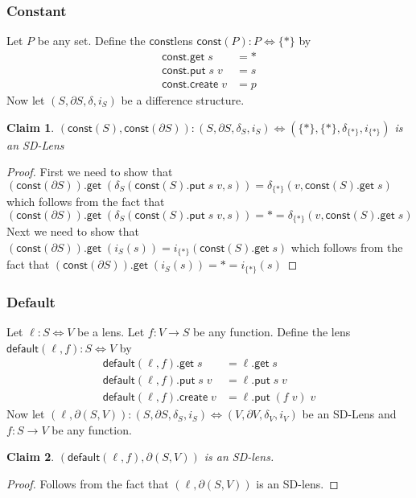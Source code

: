 \documentclass[acmsmall,review,anonymous]{acmart}\settopmatter{printfolios=true,printccs=false,printacmref=false}
\newtheorem{claim}{Claim}
\newcommand{\kw}[1]{\ensuremath{\mathsf{#1}}}
\newcommand{\get}{\ensuremath{\kw{get}}}
\newcommand{\pput}{\ensuremath{\kw{put}}}
\newcommand{\create}{\ensuremath{\kw{create}}}
\newcommand{\const}{\ensuremath{\kw{const}}}
\newcommand{\default}{\ensuremath{\kw{default}}}
\begin{document}
\subsubsection{Constant}
Let $P$ be any set. Define the \const lens $\const(P) : P \Leftrightarrow \{*\}$
by
\begin{align*}
\const.\get \; s &= *\\
\const.\pput \; s \; v &= s\\
\const.\create \; v &= p
\end{align*}
Now let $(S, \partial S, \delta, i_S)$ be a difference structure.
\begin{claim}
$(\const(S),  \const(\partial S)) : (S, \partial S, \delta_S, i_S)
\Leftrightarrow (\{*\}, \{*\}, \delta_{\{*\}}, i_{\{*\}})$ is an SD-Lens
\end{claim}
\begin{proof}
First we need to show that $(\const(\partial S)).\get \;
(\delta_S(\const(S).\pput \; s \; v, s)) = \delta_{\{*\}}(v, \const(S).\get \;
s)$ which follows from the fact that $ (\const(\partial S)).\get \;
(\delta_S(\const(S).\pput \; s \; v, s)) = * = \delta_{\{*\}}(v, \const(S).\get
\; s) $
Next we need to show that $(\const(\partial S)).\get \; (i_{S}(s)) =
i_{\{*\}}(\const(S).\get \; s)$ which follows from the fact that
$(\const(\partial S)).\get \; (i_{S}(s)) = * = i_{\{*\}}(s)$
\end{proof}

\subsubsection{Default}
Let $\ell : S \Leftrightarrow V$ be a lens. Let $f :
V \longrightarrow S$ be any function. Define the lens $\default(\ell, f) :
S \Leftrightarrow V$ by
\begin{align*}
\default(\ell, f).\get \; s &= \ell.\get \; s\\
\default(\ell, f).\pput \; s \; v &= \ell.\pput \; s \; v\\
\default(\ell, f).\create \; v &= \ell.\pput \; (f \; v) \; v
\end{align*}
Now let $(\ell, \partial (S, V)) : (S, \partial S, \delta_S, i_S) \Leftrightarrow
(V, \partial V, \delta_V, i_V)$ be an SD-Lens and $f: S \longrightarrow V$ be
any function.
\begin{claim}
$(\default(\ell, f), \partial (S, V))$ is an SD-lens.
\end{claim}
\begin{proof}
Follows from the fact that $(\ell, \partial (S, V))$ is an SD-lens.
\end{proof}
\end{document}
